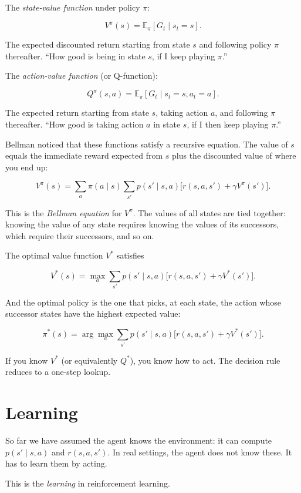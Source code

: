The \emph{state-value function} under policy $\pi$:

$$V^\pi(s) = \mathbb{E}_\pi[G_t \mid s_t = s].$$

The expected discounted return starting from state $s$ and following policy $\pi$ thereafter. ``How good is being in state $s$, if I keep playing $\pi$.''

The \emph{action-value function} (or Q-function):

$$Q^\pi(s, a) = \mathbb{E}_\pi[G_t \mid s_t = s, a_t = a].$$

The expected return starting from state $s$, taking action $a$, and following $\pi$ thereafter. ``How good is taking action $a$ in state $s$, if I then keep playing $\pi$.''

Bellman noticed that these functions satisfy a recursive equation. The value of $s$ equals the immediate reward expected from $s$ plus the discounted value of where you end up:

$$V^\pi(s) = \sum_a \pi(a \mid s) \sum_{s'} p(s' \mid s, a) \big[r(s, a, s') + \gamma V^\pi(s')\big].$$

This is the \emph{Bellman equation} for $V^\pi$. The values of all states are tied together: knowing the value of any state requires knowing the values of its successors, which require their successors, and so on.

The optimal value function $V^*$ satisfies

$$V^*(s) = \max_a \sum_{s'} p(s' \mid s, a) \big[r(s, a, s') + \gamma V^*(s')\big].$$

And the optimal policy is the one that picks, at each state, the action whose successor states have the highest expected value:

$$\pi^*(s) = \arg\max_a \sum_{s'} p(s' \mid s, a) \big[r(s, a, s') + \gamma V^*(s')\big].$$

If you know $V^*$ (or equivalently $Q^*$), you know how to act. The decision rule reduces to a one-step lookup.

\section*{Learning}

So far we have assumed the agent knows the environment: it can compute $p(s' \mid s, a)$ and $r(s, a, s')$. In real settings, the agent does not know these. It has to learn them by acting.

This is the \emph{learning} in reinforcement learning.

